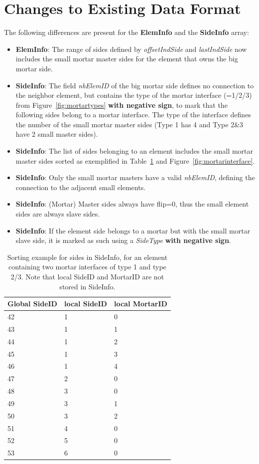 \documentclass[a4paper,headsepline]{scrreprt}
\begin{document}
\section{Changes to Existing Data Format}

The following differences are present for the \textbf{ElemInfo} and the \textbf{SideInfo} array:
\begin{itemize}
\item \textbf{ElemInfo}: The range of sides defined by \textit{offsetIndSide} and \textit{lastIndSide} now includes the small mortar master sides for the element that owns the big mortar side.
\item \textbf{SideInfo}: The field \textit{nbElemID} of the big mortar side defines no connection to the neighbor element, but contains the type of the mortar interface (=1/2/3) from Figure~\ref{fig:mortartypes} \textbf{with negative sign}, to mark that the following sides belong to a mortar interface. The type of the interface defines the number of the small mortar master sides (Type 1 has 4 and Type 2\&3 have 2 small master sides). 
\item \textbf{SideInfo}: The list of sides belonging to an element includes the small mortar master sides sorted as exemplified in Table~\ref{tab:mortarsorting} and Figure~\ref{fig:mortarinterface}.
\item \textbf{SideInfo}: Only the small mortar masters have a valid \textit{nbElemID}, defining the connection to the adjacent small elements.
\item \textbf{SideInfo}: (Mortar) Master sides always have flip=0, thus the small element sides are always slave sides.
\item \textbf{SideInfo}: If the element side belongs to a mortar but with the small mortar slave side, it is marked as such using a \textit{SideType} \textbf{with negative sign}.
\end{itemize}

\begin{table}[h!]
\label{tab:mortarsorting}
\centering
\begin{tabular}{|l|l|l|} \hline
  Global SideID & local SideID & local MortarID  \\ \hline
   42 & 1 & 0  \\ 
   43 & 1 & 1  \\ 
   44 & 1 & 2  \\ 
   45 & 1 & 3  \\ 
   46 & 1 & 4  \\ \hline
   47 & 2 & 0  \\ \hline
   48 & 3 & 0  \\ 
   49 & 3 & 1  \\ 
   50 & 3 & 2  \\ \hline
   51 & 4 & 0  \\ \hline
   52 & 5 & 0  \\ \hline
   53 & 6 & 0  \\ \hline
\end{tabular}
\caption{Sorting example for sides in SideInfo, for an element containing two mortar interfaces of type 1 and type 2/3. Note that local SideID and MortarID are not stored in SideInfo.}
\end{table}
\end{document}
